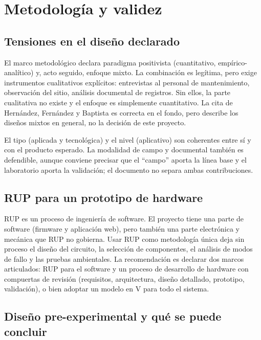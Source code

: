 \documentclass[11pt,a4paper]{article}
\begin{document}
\section{Metodología y validez}

\subsection{Tensiones en el diseño declarado}

El marco metodológico declara paradigma positivista (cuantitativo, empírico-analítico) y, acto seguido, enfoque mixto. La combinación es legítima, pero exige instrumentos cualitativos explícitos: entrevistas al personal de mantenimiento, observación del sitio, análisis documental de registros. Sin ellos, la parte cualitativa no existe y el enfoque es simplemente cuantitativo. La cita de Hernández, Fernández y Baptista es correcta en el fondo, pero describe los diseños mixtos en general, no la decisión de este proyecto.

El tipo (aplicada y tecnológica) y el nivel (aplicativo) son coherentes entre sí y con el producto esperado. La modalidad de campo y documental también es defendible, aunque conviene precisar que el ``campo'' aporta la línea base y el laboratorio aporta la validación; el documento no separa ambas contribuciones.

\subsection{RUP para un prototipo de hardware}

RUP es un proceso de ingeniería de software. El proyecto tiene una parte de software (firmware y aplicación web), pero también una parte electrónica y mecánica que RUP no gobierna. Usar RUP como metodología única deja sin proceso el diseño del circuito, la selección de componentes, el análisis de modos de fallo y las pruebas ambientales. La recomendación es declarar dos marcos articulados: RUP para el software y un proceso de desarrollo de hardware con compuertas de revisión (requisitos, arquitectura, diseño detallado, prototipo, validación), o bien adoptar un modelo en V para todo el sistema.

\subsection{Diseño pre-experimental y qué se puede concluir}
\end{document}
